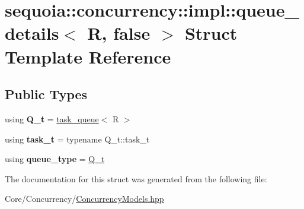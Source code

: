 \hypertarget{structsequoia_1_1concurrency_1_1impl_1_1queue__details_3_01_r_00_01false_01_4}{}\section{sequoia\+::concurrency\+::impl\+::queue\+\_\+details$<$ R, false $>$ Struct Template Reference}
\label{structsequoia_1_1concurrency_1_1impl_1_1queue__details_3_01_r_00_01false_01_4}
\subsection*{Public Types}
\begin{DoxyCompactItemize}
\item 
\mbox{\label{structsequoia_1_1concurrency_1_1impl_1_1queue__details_3_01_r_00_01false_01_4_a4bdc5344b697cbf04eb3110ee7166f9d}} 
using {\bfseries Q\+\_\+t} = \mbox{\hyperlink{classsequoia_1_1concurrency_1_1task__queue}{task\+\_\+queue}}$<$ R $>$
\item 
\mbox{\label{structsequoia_1_1concurrency_1_1impl_1_1queue__details_3_01_r_00_01false_01_4_a17135fed8376898add44965f2b6ff551}} 
using {\bfseries task\+\_\+t} = typename Q\+\_\+t\+::task\+\_\+t
\item 
\mbox{\label{structsequoia_1_1concurrency_1_1impl_1_1queue__details_3_01_r_00_01false_01_4_a08b9ff45aa5663de17e24e58c0d48135}} 
using {\bfseries queue\+\_\+type} = \mbox{\hyperlink{classsequoia_1_1concurrency_1_1task__queue}{Q\+\_\+t}}
\end{DoxyCompactItemize}


The documentation for this struct was generated from the following file\+:\begin{DoxyCompactItemize}
\item 
Core/\+Concurrency/\mbox{\hyperlink{_concurrency_models_8hpp}{Concurrency\+Models.\+hpp}}\end{DoxyCompactItemize}
